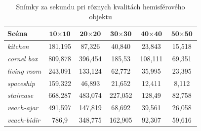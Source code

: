 \begin{table}[h!] \label{HSGFPS}
\centering
\begin{tabular}{|l|c|c|c|c|c|}
\hline
\textbf{Scéna} & $\textbf{10} \times \textbf{10}$ & $\textbf{20} \times \textbf{20}$ & $\textbf{30} \times \textbf{30}$ & $\textbf{40} \times \textbf{40}$ & $\textbf{50} \times \textbf{50}$ \\ \hline
\textit{kitchen} & 181,195 & 87,326 & 40,840 & 23,843 & 15,518 \\ \hline
\textit{cornel box} & 809,878 & 396,454 & 185,53 & 108,111 & 69,351 \\ \hline
\textit{living room} & 243,091 & 133,124 & 62,772 & 35,995 & 23,395 \\ \hline
\textit{spaceship} & 159,322 & 46,893 & 21,652 & 12,411 & 8,112 \\ \hline
\textit{staircase} & 668,287 & 483,074 & 227,052 & 128,49 & 82,758 \\ \hline
\textit{veach-ajar} & 491,597 & 147,819 & 68,692 & 39,561 & 26,058 \\ \hline
\textit{veach-bidir} & 786,9 & 348,775 & 162,905 & 92,307 & 59,616 \\ \hline
\end{tabular}
\caption{Snímky za sekundu pri rôznych kvalitách hemisférového objektu}
\end{table}

